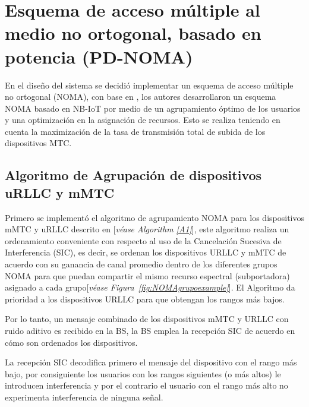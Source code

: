 \hfill

\break

\section{Esquema de acceso múltiple al medio no ortogonal, basado en potencia (PD-NOMA)}

En el diseño del sistema se decidió implementar un esquema de acceso múltiple no ortogonal (NOMA), con base en \parencite{Shahini2019}, los autores desarrollaron un esquema NOMA basado en NB-IoT por medio de un agrupamiento óptimo de los usuarios y una optimización en la asignación de recursos. Esto se realiza teniendo en cuenta la maximización de la tasa de transmisión total de subida de los dispositivos MTC.\newline

\subsection{Algoritmo de Agrupación de dispositivos uRLLC  y mMTC}

Primero se implementó el algoritmo de agrupamiento NOMA para los dispositivos mMTC y uRLLC descrito en \parencite{Shahini2019}[\textit{véase Algorithm \ref{A1}}], este algoritmo realiza un ordenamiento conveniente con respecto al uso de la Cancelación Sucesiva de Interferencia (SIC), es decir, se ordenan los dispositivos URLLC y mMTC de acuerdo con su ganancia de canal promedio dentro de los diferentes grupos NOMA para que puedan compartir el mismo recurso espectral (subportadora) asignado a cada grupo[\textit{véase Figura~\ref{fig:NOMAgrupoexample}}]. El Algoritmo da prioridad a los dispositivos URLLC para que obtengan los rangos más bajos. \newline

Por lo tanto, un mensaje combinado de los dispositivos mMTC y URLLC con ruido aditivo es recibido en la BS, la BS emplea la recepción SIC de acuerdo en cómo son ordenados los dispositivos. \newline

La recepción SIC decodifica primero el mensaje del dispositivo con el rango más bajo, por consiguiente los usuarios con los rangos siguientes (o más altos) le introducen interferencia y por el contrario el usuario con el rango más alto no experimenta interferencia de ninguna señal.\newline

